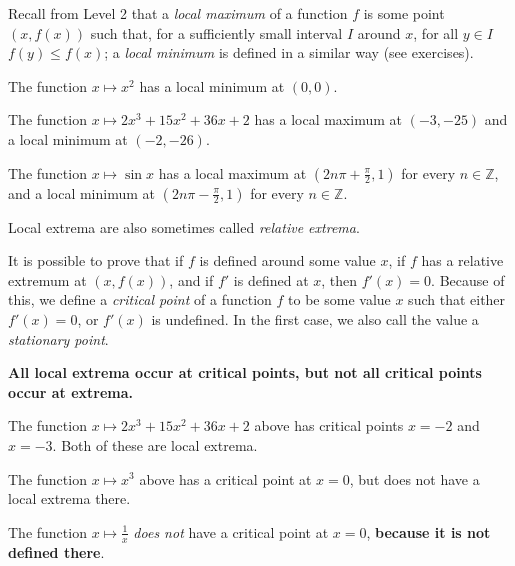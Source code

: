


Recall from Level 2 that a \textit{local maximum} of a function $ f $ is some point $ (x, f(x)) $
such that, for a sufficiently small interval $ I $ around $ x $, for all $ y \in I $ $ f(y) \leq f(x) $;
a \textit{local minimum} is defined in a similar way (see exercises).

\begin{ex}
  The function $ x \mapsto x^2 $ has a local minimum at $ (0, 0) $.
\end{ex}
\begin{ex}
  The function $ x \mapsto 2x^3 + 15x^2 + 36x + 2 $ has a local maximum at $ (-3, -25) $ and a local minimum at $ (-2, -26) $.
\end{ex}
\begin{ex}
  The function $ x \mapsto \sin x $ has a local maximum at $ (2n\pi + \frac{\pi}{2}, 1) $ for every $ n \in \mathbb{Z} $, and
  a local minimum at $ (2n\pi - \frac{\pi}{2}, 1) $ for every $ n \in \mathbb{Z} $.
\end{ex}

Local extrema are also sometimes called \textit{relative extrema}.

It is possible to prove that if $ f $ is defined around some value $ x $, if $ f $ has a relative extremum at $ (x, f(x)) $, and
if $ f' $ is defined at $ x $, then $ f'(x) = 0 $. Because of this, we define a \textit{critical point}
of a function $ f $ to be some value $ x $ such that either $ f'(x) = 0 $, or $ f'(x) $ is undefined. In the first case, we also
call the value a \textit{stationary point}.

\textbf{All local extrema occur at critical points, but not all critical points occur at extrema.}

\begin{ex}
  The function $ x \mapsto 2x^3 + 15x^2 + 36x + 2 $ above has critical points $ x = -2 $ and $ x = -3 $. Both of
  these are local extrema.
\end{ex}

\begin{ex}
  The function $ x \mapsto x^3 $ above has a critical point at $ x = 0 $, but does not have a local extrema there.
\end{ex}

\begin{ex}
  The function $ x \mapsto \frac{1}{x} $ \textit{does not} have a critical point at $ x = 0 $, \textbf{because it is not defined there}.
\end{ex}


